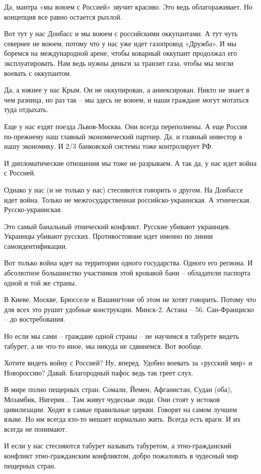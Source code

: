 Да, мантра «мы воюем с Россией» звучит красиво. Это ведь облагораживает. Но
концепция все равно остается рыхлой.

Вот тут у нас Донбасс и мы воюем с российскими оккупантами. А тут чуть севернее
не воюем, потому что у нас уже идет газопровод «Дружба». И мы боремся на
международной арене, чтобы коварный оккупант продолжал его эксплуатировать. Нам
ведь нужны деньги за транзит газа, чтобы мы могли воевать с оккупантом.

Да, а южнее у нас Крым. Он не оккупирован, а аннексирован. Никто не знает в чем
разница, но раз так – мы здесь не воюем, и наши граждане могут мотаться туда
отдыхать.

Еще у нас ездят поезда Львов-Москва. Они всегда переполнены. А еще Россия
по-прежнему наш главный экономический партнер. Да, и главный инвестор в нашу
экономику. И 2/3 банковской системы тоже контролирует РФ.

И дипломатические отношения мы тоже не разрываем. А так да, у нас идет война с
Россией.

Однако у нас (и не только у нас) стесняются говорить о другом. На Донбассе идет
война. Только не межгосударственная российско-украинская. А этническая.
Русско-украинская.

Это самый банальный этнический конфликт. Русские убивают украинцев. Украинцы
убивают русских. Противостояние идет именно по линии самоидентификации.

Вот только война идет на территории одного государства. Одного его региона. И
абсолютное большинство участников этой кровавой бани – обладатели паспорта
одной и той же страны.

В Киеве, Москве, Брюсселе и Вашингтоне об этом не хотят говорить. Потому что
для всех это рушит удобные конструкции. Минск-2. Астана – 56. Сан-Франциско –
до востребования.

Но если мы сами – граждане одной страны – не научимся в табурете видеть
табурет, а не что-то иное, мы никуда не сдвинемся. Вот вообще.

Хотите видеть войну с Россией? Ну, вперед. Удобно воевать за «русский мир» и
Новороссию? Давай. Благородный пафос ведь так греет слух.

В мире полно пещерных стран. Сомали, Йемен, Афганистан, Судан (оба), Мозамбик,
Нигерия... Там живут чудесные люди. Они стоят у истоков цивилизации. Ходят в
самые правильные церкви. Говорят на самом лучшем языке. Но им всегда кто-то
мешает нормально жить. Всегда есть враги. И их всегда не понимают.

И если у нас стесняются табурет называть табуретом, а этно-гражданский конфликт
этно-гражданским конфликтом, добро пожаловать в чудесный мир пещерных стран.


